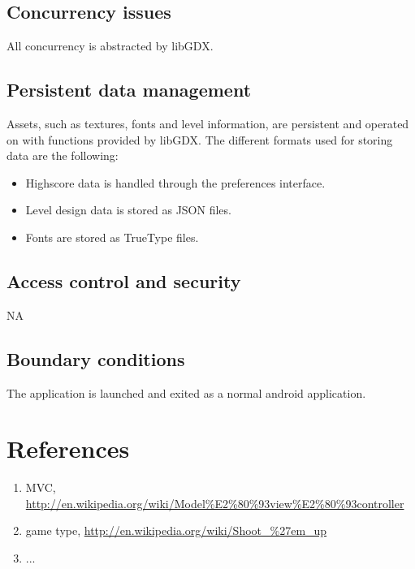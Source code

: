 \documentclass{article}
\begin{document}
\subsection{Concurrency issues}
All concurrency is abstracted by libGDX.

\subsection{Persistent data management}
Assets, such as textures, fonts and level information, are persistent and operated on with functions provided by libGDX. The different formats used for storing data are the following: 
\begin{itemize}
  \item Highscore data is handled through the preferences interface.
  \item Level design data is stored as JSON files.
  \item Fonts are stored as TrueType files.
\end{itemize}

\subsection{Access control and security}
NA


\subsection{Boundary conditions}
The application is launched and exited as a normal android application.

\section{References}
\begin{enumerate}
  \item MVC, \url{http://en.wikipedia.org/wiki/Model%E2%80%93view%E2%80%93controller}
  \item game type, \url{http://en.wikipedia.org/wiki/Shoot_%27em_up}
  \item ...
\end{enumerate}
\end{document}
